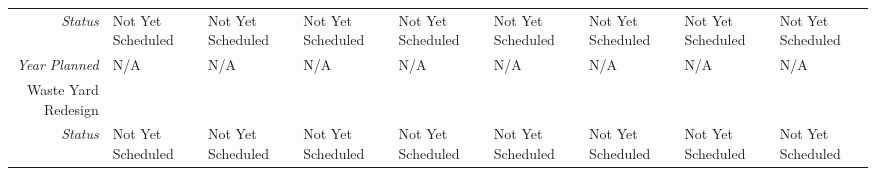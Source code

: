 \begin{tabularx}{\textwidth}{r|X|X|X|X|X|X|X|X|}
    \multicolumn{1}{|r|}{\cellcolor{ccorangelight}\textit{Status}}                & Not Yet Scheduled                                                         & Not Yet Scheduled                                                         & Not Yet Scheduled                                                         & Not Yet Scheduled                                                         & Not Yet Scheduled                                                         & Not Yet Scheduled                                                         & Not Yet Scheduled                                                         & Not Yet Scheduled                                                         \\
    \multicolumn{1}{|r|}{\cellcolor{ccorangelight}\textit{Year Planned}}                  & N/A                                                     & N/A                                                     & N/A                                                     & N/A                                                     & N/A                                                     & N/A                                                     & N/A                                                     & N/A                                                     \\ \hline
\multicolumn{1}{|V{.2\columnwidth}|}{\cellcolor{ccorangelight}Waste Yard Redesign}          &                                                                  &                                                                  &                                                                  &                                                                  &                                                                  &                                                                  &                                                                  &                                                                  \\
    \multicolumn{1}{|r|}{\cellcolor{ccorangelight}\textit{Status}}                & Not Yet Scheduled                                                         & Not Yet Scheduled                                                         & Not Yet Scheduled                                                         & Not Yet Scheduled                                                         & Not Yet Scheduled                                                         & Not Yet Scheduled                                                         & Not Yet Scheduled                                                         & Not Yet Scheduled                                                         \\

\end{tabularx}
